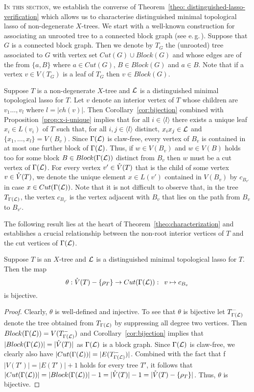 \textsc{In this section}, we establish the converse of Theorem~\ref{theo:
  distinguished-lasso-verification} which allows us to characterise
distinguished minimal topological lasso of non-degenerate $X$-trees.  We start
with a well-known construction for associating an unrooted tree to a connected
block graph (see e.\,g.\,\cite{diestel}).  Suppose that $G$ is a connected
block graph. Then we denote by $T_G$ the (unrooted) tree associated to $G$
with vertex set $Cut(G)\cup Block(G)$ and whose edges are of the from
$\{a,B\}$ where $a\in Cut(G)$, $B\in Block(G)$ and $a\in B$. Note that if a
vertex $v\in V(T_G)$ is a leaf of $T_G$ then $v\in Block(G)$.

Suppose $T$ is a non-degenerate $X$-tree and ${\mathcal L}$ is a distinguished minimal
topological lasso for $T$.  Let $v$ denote an interior vertex of $T$ whose
children are $v_1\ldots,v_l$ where $l=|ch(v)|$. Then
Corollary~\ref{cor:bijection} combined with Proposition~\ref{prop:x-i-unique}
implies that for all $i\in\langle l\rangle$ there exists a unique leaf $x_i\in
L(v_i)$ of $T$ such that, for all $i,j\in\langle l\rangle$ distinct,
$x_ix_j\in {\mathcal L}$ and $\{x_1,\ldots, x_l\}=V(B_v)$. Since $\Gamma({\mathcal L})$ is
claw-free, every vertex of $B_v$ is contained in at most one further block of
$\Gamma({\mathcal L})$. Thus, if $w\in V(B_v)$ and $w\in V(B) $ holds too for some
block $B\in Block(\Gamma({\mathcal L}))$ distinct from $B_v$ then $w$ must be a cut
vertex of $\Gamma({\mathcal L})$. For every vertex $v'\in \mathring{V}(T)$ that is the child of
some vertex $v\in \mathring{V}(T)$, we denote the unique element $x\in L(v')$ contained
in $V(B_v)$ by $c_{B_{v'}}$ in case $x\in Cut(\Gamma({\mathcal L}))$.  Note that it is
not difficult to observe that, in the tree $T_{\Gamma({\mathcal L})}$, the vertex
$c_{B_{v'}}$ is the vertex adjacent with $B_v$ that lies on the path from
$B_v$ to $B_{v'}$.

The following result lies at the heart of Theorem~\ref{theo:characterization}
and establishes a crucial relationship between the non-root interior vertices
of $T$ and the cut vertices of $\Gamma({\mathcal L})$.

\begin{lem}
  \label{lem:bijection-theta}
  Suppose $T$ is an $X$-tree and ${\mathcal L}$ is a distinguished minimal topological
  lasso for $T$. Then the map
$$
\theta :\mathring{V}(T)-\{\rho_T\} \to Cut(\Gamma({\mathcal L})):\,\,\,v\mapsto c_{B_{v}}
$$ 
is bijective.
\end{lem}
\begin{proof}
  Clearly, $\theta$ is well-defined and injective. To see that $\theta$ is
  bijective let $ T_{\Gamma({\mathcal L})}^-$ denote the tree obtained from $
  T_{\Gamma({\mathcal L})}$ by suppressing all degree two vertices. Then
  $Block(\Gamma({\mathcal L}))=V(T_{\Gamma({\mathcal L})}^-)$ and Corollary~\ref{cor:bijection}
  implies that $|Block(\Gamma({\mathcal L}))|=|\mathring{V}(T)|$ as $\Gamma({\mathcal L})$ is a block
  graph. Since $\Gamma({\mathcal L})$ is claw-free, we clearly also have
  $|Cut(\Gamma({\mathcal L}))|=|E(T_{\Gamma({\mathcal L})}^-)|$. Combined with the fact that f
  $|V(T')|= |E(T')|+1$ holds for every tree $T'$, it follows that
  $|Cut(\Gamma({\mathcal L}))|=|Block(\Gamma({\mathcal L}))|-1=|\mathring{V}(T)|-1=
  |\mathring{V}(T)-\{\rho_T\}|$. Thus, $\theta$ is bijective.  \qquad
\end{proof}

